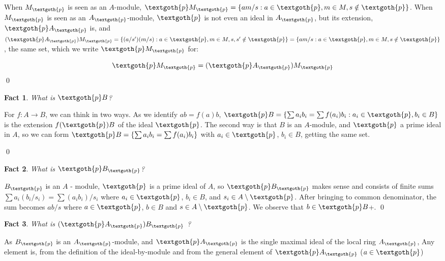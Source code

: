 \documentclass{article}
\newtheorem{theorem}{Fact}[section]
\begin{document}
\noindent
When $M_\textgoth{p}$ is seen as an $A$-module, $\textgoth{p} M_\textgoth{p} = \{am/s: a \in \textgoth{p}, m \in M, s \notin \textgoth{p} \}$. When $M_\textgoth{p}$ is seen as an $A_\textgoth{p}$-module, $\textgoth{p}$ is not even an ideal in $A_\textgoth{p}$, but its extension, $\textgoth{p} A_\textgoth{p}$ is, and $(\textgoth{p} A_\textgoth{p}) M_\textgoth{p} = \{(a/s')(m/s): a \in \textgoth{p}, m \in M, s, s' \notin \textgoth{p} \} = \{am/s: a \in \textgoth{p}, m \in M, s \notin \textgoth{p} \}$, the same set, which we write $\textgoth{p} M_\textgoth{p}$ for:

\[
  \textgoth{p} M_\textgoth{p} = (\textgoth{p} A_\textgoth{p}) M_\textgoth{p}
\]
\qed

\bigskip
\begin{theorem}
What is $\textgoth{p} B$?
\end{theorem}

For $f: A \rightarrow B$, we can think in two ways. As we identify $ab = f(a)b$,  $\textgoth{p} B = \{ \sum a_i b_i = \sum f(a_i)b_i : a_i \in \textgoth{p}, b_i \in B \}$ is the extension $f(\textgoth{p}) B$ of the ideal $\textgoth{p}$. The second way is that $B$ is an $A$-module, and $\textgoth{p}$ a prime ideal in $A$, so we can form $ \textgoth{p} B = \{ \sum a_i b_i = \sum f(a_i)b_i \} $ with $a_i \in \textgoth{p}$, $b_i \in B$, getting the same set.

\qed

\bigskip
\begin{theorem}
What is $ \textgoth{p} B_\textgoth{p}$?
\end{theorem}

$B_\textgoth{p}$ is an $A$ - module, $\textgoth{p}$ is a prime ideal of $A$, so $ \textgoth{p} B_\textgoth{p}$ makes sense and consists of finite sums $\sum a_i (b_i / s_i) = \sum (a_i b_i)/s_i$ where $a_i \in \textgoth{p}$, $b_i \in B$, and $s_i \in A \setminus \textgoth{p}$.
After bringing to common denominator, the sum becomes $ab/s$ where $a \in \textgoth{p}$, $b \in B$ and $s \in A \setminus \textgoth{p}$. We observe that $b \in \textgoth{p} B$+.
\qed

\bigskip
\begin{theorem}
What is $(\textgoth{p} A_\textgoth{p}) B_\textgoth{p}$ ?
\end{theorem}

As $B_\textgoth{p}$ is an $A_\textgoth{p}$-module, and $\textgoth{p} A_\textgoth{p}$ is the single maximal ideal of the local ring $A_\textgoth{p}$, Any element is, from the definition of the ideal-by-module and from the general element of $\textgoth{p} A_\textgoth{p}$ ($a \in \textgoth{p}$)
\end{document}
